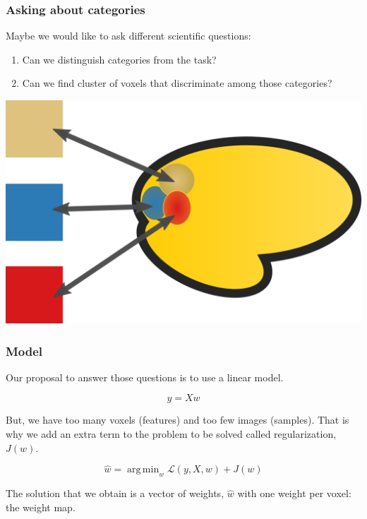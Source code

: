 \documentclass[11pt]{beamer}
\DeclareMathOperator*{\argmin}{arg\,min}
\begin{document}
\begin{frame}
    \frametitle{Asking about categories}

    Maybe we would like to ask different scientific questions:
    \begin{enumerate}
        \item Can we distinguish categories from the task?
        \item Can we find cluster of voxels that discriminate among those categories?
    \end{enumerate}

    \begin{center}
        \includegraphics[scale=0.2]{figures/decoding.png}
    \end{center}

\end{frame}

\begin{frame}
    \frametitle{Model}
    Our proposal to answer those questions is to use a linear model. 

    \[y = Xw\]

    But, we have too many voxels (features) and too few images (samples). That
    is why we add an extra term to the problem to be solved called
    regularization, $J(w)$.

    \[\hat{w} = \argmin_{w} \mathcal{L}\left(y, X, w \right) + J(w) \]

    The solution that we obtain is a vector of weights, $\hat{w}$ with one
    weight per voxel: the weight map.  

\end{frame}
\end{document}
